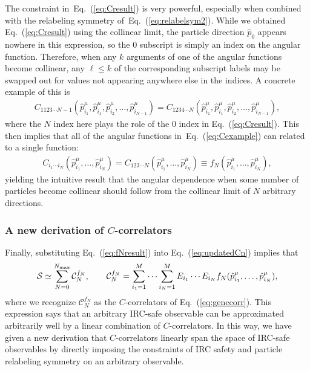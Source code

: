 \documentclass[letterpaper,11pt]{article}
\DeclareRobustCommand{\Eq}[1]{Eq.~(\ref{#1})}
\begin{document}
The constraint in~\Eq{eq:Cresult} is very powerful, especially when combined with the relabeling symmetry of~\Eq{eq:relabelsym2}.
%
While we obtained \Eq{eq:Cresult} using the collinear limit, the particle direction $\hat{p}_{0}$ appears nowhere in this expression, so the $0$ subscript is simply an index on the angular function.
%
Therefore, when any $k$ arguments of one of the angular functions become collinear, any $\ell\le k$ of the corresponding subscript labels may be swapped out for values not appearing anywhere else in the indices.  
%
A concrete example of this is
\begin{align}\label{eq:relabelex}
C_{1123\cdots N-1}(\hat p_{i_1}^\mu,\hat p_{i_1}^\mu,\hat p_{i_2}^\mu,\ldots,\hat p_{i_{N-1}}^\mu)=C_{1234\cdots N}(\hat p_{i_1}^\mu,\hat p_{i_1}^\mu,\hat p_{i_2}^\mu,\ldots,\hat p_{i_{N-1}}^\mu),
\end{align}
where the $N$ index here plays the role of the $0$ index in \Eq{eq:Cresult}.
%
This then implies that all of the angular functions in~\Eq{eq:Cexample} can related to a single function:
\begin{align}\label{eq:fNresult}
C_{i_1\cdots i_N}(\hat p_{i_1}^\mu, \ldots, \hat p_{i_N}^\mu) = C_{123\cdots N}(\hat p_{i_1}^\mu,\ldots,\hat p_{i_N}^\mu) \equiv f_N(\hat p_{i_1}^\mu,\ldots,\hat p_{i_N}^\mu),
\end{align}
yielding the intuitive result that the angular dependence when some number of particles become collinear should follow from the collinear limit of $N$ arbitrary directions.


\subsubsection{A new derivation of $C$-correlators}
\label{subsec:final}

Finally, substituting \Eq{eq:fNresult} into \Eq{eq:updatedCn} implies that 
\begin{align}\label{eq:Eexpansionresult}
\mathcal S\simeq\sum_{N=0}^{N_{\rm max}}\mathcal C_N^{f_N},\qquad \mathcal C_N^{f_N}=\sum_{i_1=1}^M\cdots\sum_{i_N=1}^M E_{i_1}\cdots E_{i_N} f_N(\hat p_{i_1}^\mu,\ldots,\hat p_{i_N}^\mu),
\end{align}
where we recognize $\mathcal C_N^{f_N}$ as the $C$-correlators of \Eq{eq:genccorr}.
%
This expression says that an arbitrary IRC-safe observable can be approximated arbitrarily well by a linear combination of $C$-correlators.
%
In this way, we have given a new derivation that $C$-correlators linearly span the space of IRC-safe observables by directly imposing the constraints of IRC safety and particle relabeling symmetry on an arbitrary observable.
\end{document}
